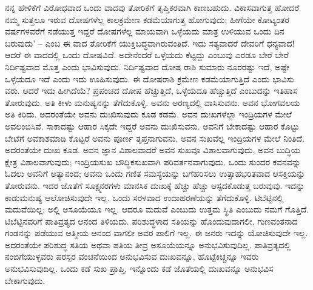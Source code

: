ನನ್ನ ಹೇಳಿಕೆಗೆ ವಿರೋಧವಾದ ಒಂದು ವಾದವು ತೋರಿಕೆಗೆ ತೃಪ್ತಿಕರವಾಗಿ ಕಾಣಬಹುದು. ವಿಕಾಸವಾಗುತ್ತ ಹೋದರೆ ನಮ್ಮ ಸುತ್ತಲೂ ಇರುವ ದೋಷಗಳೆಲ್ಲ ಕಾಲಕ್ರಮೇಣ ಕಡಮೆಯಾಗುತ್ತ ಹೋಗುವುದು; ಹೀಗೆಯೇ ಕೋಟ್ಯಂತರ ವರ್ಷಗಳವರೆಗೆ ನಡೆಯುತ್ತ ಇದ್ದರೆ ದೋಷಗಳೆಲ್ಲ ಮಾಯವಾಗಿ ಒಳ್ಳೆಯದು ಮಾತ್ರ ಉಳಿಯುವ ಒಂದು ದಿನ ಬರುವುದು’ – ಎಂಬ ಈ ವಾದ ತೋರಿಕೆಗೆ ಯುಕ್ತಿಬದ್ಧವಾಗಿರುವಂತಿದೆ. ಇದು ಸತ್ಯವಾದರೆ ದೇವರಿಗೆ ಧನ್ಯವಾದ! ಆದರೆ ಈ ವಾದದಲ್ಲಿ ಒಂದು ದೋಷವಿದೆ. ಅದೇನೆಂದರೆ ಒಳ್ಳೆಯದು ಕೆಟ್ಟದ್ದು ಎಂಬುವು ಎರಡೂ ಬೇರೆ ಬೇರೆ ನಿರ್ದಿಷ್ಟವಾದ ಮೊತ್ತ ಎಂದು ಭಾವಿಸುವುದು. ನಿರ್ದಿಷ್ಟವಾದ ದೋಷ ರಾಶಿ ಸುಮಾರು ನೂರರಷ್ಟು ಇದೆ, ಅಷ್ಟೇ ಒಳ್ಳೆಯದೂ ಇದೆ ಎಂದು ಇದು ಊಹಿಸುವುದು. ಈ ದೋಷರಾಶಿ ಕ್ರಮೇಣ ಕಡಮೆಯಾಗುತ್ತಿದೆ ಎಂದು ಭಾವಿಸು ವರು. ಆದರೆ ಇದು ಹೀಗಿದೆಯೆ? ಪ್ರಪಂಚದ ದೋಷ ಹೆಚ್ಚುತ್ತಿದೆ, ಒಳ್ಳೆಯದೂ ಹೆಚ್ಚುತ್ತಿದೆ ಎಂಬುದನ್ನು ಇತಿಹಾಸ ತೋರುವುದು. ಅತಿ ಕೀಳು ಮನುಷ್ಯನನ್ನು ತೆಗೆದುಕೊಳ್ಳಿ. ಅವನು ಅರಣ್ಯದಲ್ಲಿ ವಾಸಿಸುವನು. ಅವನ ಭೋಗವಲಯ ಅತಿ ಕಿರಿದು. ಅದರಂತೆಯೇ ಅವನು ದುಃಖಿಸುವುದು ಕೂಡ ಕಡಮೆ. ಅವನ ದುಃಖಗಳೆಲ್ಲಾ ಇಂದ್ರಿಯಗಳ ಮೇಲೆ ಅವಲಂಬಿಸಿವೆ. ಸಾಕಾದಷ್ಟು ಆಹಾರ ಸಿಕ್ಕದೇ ಇದ್ದರೆ ಅವನು ದುಃಖಿಸುವನು. ಅವನಿಗೆ ಬೇಕಾದಷ್ಟು ಆಹಾರ ಕೊಟ್ಟು ಬೇಟೆಗೆ ಅವಕಾಶಮಾಡಿ ಕೊಟ್ಟರೆ ಅವನು ಪೂರ್ಣ ತೃಪ್ತನಾಗುವನು. ಅವನ ಸುಖವೆಲ್ಲ ಇಂದ್ರಿಯಗಳ ಮೇಲೆ ನಿಂತಿದೆ. ಅದರಂತೆಯೇ ದುಃಖ ಕೂಡ. ಅವನ ಜ್ಞಾನ ವಿಶಾಲವಾದರೆ ಅವನ ಸುಖವೂ ವಿಶಾಲವಾಗುವುದು, ಅವನ ಬುದ್ಧಿಯ ಕ್ಷೇತ್ರ ವಿಶಾಲವಾಗುವುದು; ಇಂದ್ರಿಯಸುಖ ಬೌದ್ಧಿಕಸುಖವಾಗಿ ಪರಿವರ್ತನವಾಗುವುದು. ಒಂದು ಸುಂದರ ಕವನವನ್ನು ಓದಲು ಅವನಿಗೆ ಅತ್ಯಾನಂದ; ಅವನು ಒಂದು ಗಣಿತ ಸಮಸ್ಯೆಯನ್ನು ಬಗೆಹರಿಸಲು ಉತ್ಸಾಹಭರಿತವಾದ ಆಸಕ್ತಿಯನ್ನು ತೋರುವನು. ಇದರ ಜೊತೆಗೆ ಸೂಕ್ಷ್ಮನರಗಳು ಮಾನಸಿಕ ದುಃಖಕ್ಕೆ ಹೆಚ್ಚು ಹೆಚ್ಚು ಆಸ್ಪದಕೊಡುತ್ತ ಬರುವುವು. ಇದನ್ನು ಕಾಡುಮನುಷ್ಯ ಆಲೋಚಿಸುವುದೇ ಇಲ್ಲ. ಒಂದು ಸರಳವಾದ ಉದಾಹರಣೆಯನ್ನು ತೆಗೆದುಕೊಳ್ಳಿ. ಟಿಬೆಟ್ಟಿನಲ್ಲಿ ಮದುವೆಯಿಲ್ಲ; ಅಲ್ಲಿ ಅಸೂಯೆಯೂ ಇಲ್ಲ. ಆದರೂ ಮದುವೆ ಎಂಬುದು ಉತ್ತಮ ಸ್ಥಿತಿ ಎಂಬುದು ನಮಗೆ ಗೊತ್ತಿದೆ. ಟಿಬೆಟ್ಟಿನವರಿಗೆ ಪಾತಿವ್ರತ್ಯದ ಆನಂದ ತಿಳಿಯದು. ಪರಿಶುದ್ಧಳಾದ ಸತಿಯನ್ನು ಹೊಂದುವುದಾಗಲೀ, ಗುಣವಂತನಾದ ಗಂಡನನ್ನು ಪಡೆಯುವ ಆತ್ಮೀಯ ಆನಂದ ವಾಗಲೀ ಅವರ ಪಾಲಿಗೆ ಇಲ್ಲ. ಈ ಜನರು ಇದನ್ನು ಯೋಚಿಸುವುದೇ ಇಲ್ಲ. ಅದರಂತೆಯೇ ಪರಿಶುದ್ಧ ಸತಿಯ ಅಥವಾ ಪತಿಯ ತೀವ್ರ ಅಸೂಯೆಯನ್ನೂ ಅನುಭವಿಸುವುದಿಲ್ಲ. ಪಾತಿವ್ರತ್ಯದಲ್ಲಿ ನಂಬಿಗೆಯುಳ್ಳವರು ಪರಸ್ಪರ ವಂಚನೆಯಿಂದ ಅನುಭವಿಸುವ ದುಃಖವನ್ನೂ, ಹೊಟ್ಟೆಕಿಚ್ಚನ್ನೂ ಇವರು ಅನುಭವಿಸುವುದಿಲ್ಲ. ಒಂದು ಕಡೆ ಸುಖ ಪ್ರಾಪ್ತಿ, ಇನ್ನೊಂದು ಕಡೆ ಜೊತೆಯಲ್ಲಿ ದುಃಖವನ್ನೂ ಅನುಭವಿಸ ಬೇಕಾಗುವುದು.

